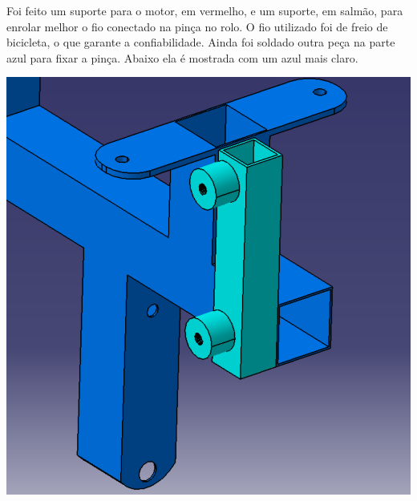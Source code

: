 
	Foi feito um suporte para o motor, em vermelho, e um suporte, em salmão, para enrolar melhor o fio conectado na pinça no rolo.  O fio utilizado foi de freio de bicicleta, o que garante a confiabilidade. Ainda foi soldado outra peça na parte azul para fixar a pinça. Abaixo ela é mostrada com um azul mais claro.

	      \begin{center}
    	\includegraphics[scale=0.5]{figuras/est_fixar_pinca}
        \label{est.fixar.pinca}
    \end{center}
